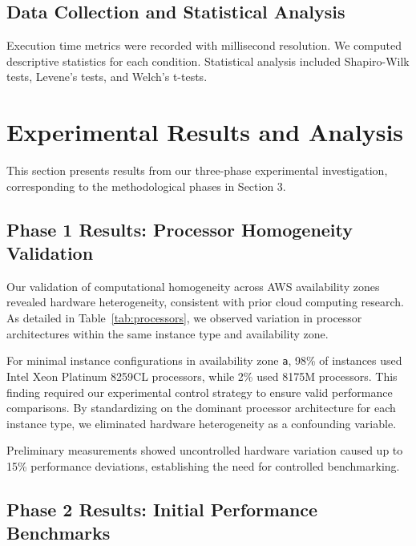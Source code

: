 \documentclass[conference]{IEEEtran}
\begin{document}
	\subsection{Data Collection and Statistical Analysis}
	\label{data-collection-and-storage}
	
	Execution time metrics were recorded with millisecond resolution. We computed descriptive statistics for each condition. Statistical analysis included Shapiro-Wilk tests, Levene's tests, and Welch's t-tests.
	
	
	\section{Experimental Results and Analysis}
	\label{experiments}
	
	This section presents results from our three-phase experimental investigation, corresponding to the methodological phases in Section 3.
	
	\subsection{Phase 1 Results: Processor Homogeneity Validation}
	\label{results-phase1}
	
	Our validation of computational homogeneity across AWS availability zones revealed hardware heterogeneity, consistent with prior cloud computing research. As detailed in Table~\ref{tab:processors}, we observed variation in processor architectures within the same instance type and availability zone.
	
	For minimal instance configurations in availability zone \texttt{a}, 98\% of instances used Intel Xeon Platinum 8259CL processors, while 2\% used 8175M processors. This finding required our experimental control strategy to ensure valid performance comparisons. By standardizing on the dominant processor architecture for each instance type, we eliminated hardware heterogeneity as a confounding variable.
	
	Preliminary measurements showed uncontrolled hardware variation caused up to 15\% performance deviations, establishing the need for controlled benchmarking.
	
	
	
	
	
	
	
	
	
	
	
	
	\subsection{Phase 2 Results: Initial Performance Benchmarks}
	\label{results-phase2}
	
\end{document}
